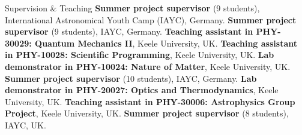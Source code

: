 \begin{rubric}{Supervision \& Teaching}
\entry*[2024 ~~~~~\,\,\,\,\,~~~~~]%
    \textbf{Summer project supervisor} (9 students), International Astronomical Youth Camp (IAYC), Germany.
\entry*[2022 ~~~~~\,\,\,\,\,~~~~~]%
    \textbf{Summer project supervisor} (9 students), IAYC, Germany.
\entry*[2021 ~~~~~\,\,\,\,\,~~~~~]%
    \textbf{Teaching assistant in PHY-30029: Quantum Mechanics II}, Keele University, UK.
\entry*[2019 -- 2022]%
    \textbf{Teaching assistant in PHY-10028: Scientific Programming}, Keele University, UK.
\entry*[2019 -- 2021]%
    \textbf{Lab demonstrator in PHY-10024: Nature of Matter}, Keele University, UK.
\entry*[2019 ~~~~~\,\,\,\,\,~~~~~]%
    \textbf{Summer project supervisor} (10 students), IAYC, Germany.
\entry*[2018 -- 2021]%
    \textbf{Lab demonstrator in PHY-20027: Optics and Thermodynamics}, Keele University, UK.
\entry*[2018 ~~~~~\,\,\,\,\,~~~~~]%
    \textbf{Teaching assistant in PHY-30006: Astrophysics Group Project}, Keele University, UK.
\entry*[2018 ~~~~~\,\,\,\,\,~~~~~]%
    \textbf{Summer project supervisor} (8 students), IAYC, UK.
\end{rubric}